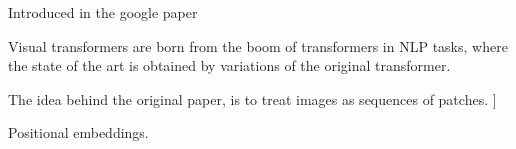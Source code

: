Introduced in the google paper


Visual transformers are born from the boom of transformers in NLP tasks, where the state of the art is obtained by variations of the original transformer.


The idea behind the original paper, is to treat images as sequences of patches. ]

Positional embeddings.
